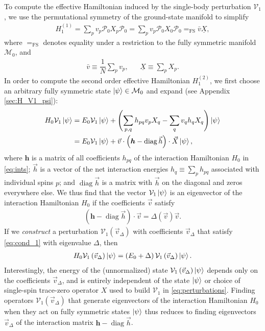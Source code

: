 \documentclass[nofootinbib,notitlepage,11pt]{revtex4-2}
\newcommand{\f}[2]{\dfrac{#1}{#2}} %
\newcommand{\p}[1]{\left(#1\right)} %
\renewcommand{\c}{\cdot} %
\newcommand{\m}{\bm} %
\renewcommand{\v}{\vec} %
\newcommand{\1}{\mathds{1}}
\newcommand{\M}{\mathcal{M}}
\renewcommand{\P}{\mathcal{P}}
\newcommand{\V}{\mathcal{V}}
\newcommand{\EQFS}{=_{\text{FS}}}
\newcommand{\col}{\underline}
\DeclareMathOperator{\diag}{diag}
\begin{document}
To compute the effective Hamiltonian induced by the single-body
perturbation $\V_1$, we use the permutational symmetry of the
ground-state manifold to simplify
\begin{align}
  H_1^{(1)} = \sum_p v_p \P_0 X_p \P_0
  = \sum_p v_p \P_0 X_0 \P_0 \EQFS \bar v \col{X},
  \label{eq:H_1_1}
\end{align}
where $\EQFS$ denotes equality under a restriction to the fully
symmetric manifold $\M_0$, and
\begin{align}
  \bar v \equiv \f1N \sum_p v_p,
  &&
  \col{X} \equiv \sum_p X_p.
\end{align}
In order to compute the second order effective Hamiltonian
$H_1^{(2)}$, we first choose an arbitrary fully symmetric state
$\ket\psi\in\M_0$ and expand (see Appendix \ref{sec:H_V1_psi}):
\begin{align}
  H_0 \V_1 \ket\psi
  &= E_0 \V_1 \ket\psi
  + \p{\sum_{p,q} h_{pq} v_p X_q - \sum_q v_q h_q X_q} \ket\psi \\
  &= E_0 \V_1 \ket\psi
  + \v v\c \p{\m h - \diag\v h}\c \v X \ket\psi,
  \label{eq:H_V1_psi}
\end{align}
where $\m h$ is a matrix of all coefficients $h_{pq}$ of the
interaction Hamiltonian $H_0$ in \eqref{eq:ints}; $\v h$ is a vector
of the net interaction energies $h_q\equiv\sum_ph_{pq}$ associated
with individual spins $p$; and $\diag\v h$ is a matrix with $\v h$ on
the diagonal and zeros everywhere else.  We thus find that the vector
$\V_1\ket\psi$ is an eigenvector of the interaction Hamiltonian $H_0$
if the coefficients $\v v$ satisfy
\begin{align}
  \p{\m h - \diag\v h}\c\v v = \Delta\p{\v v} \v v.
  \label{eq:cond_1}
\end{align}
If we {\it construct} a perturbation $\V_1\p{\v v_\Delta}$ with
coefficients $\v v_\Delta$ that satisfy \eqref{eq:cond_1} with
eigenvalue $\Delta$, then
\begin{align}
  H_0 \V_1\p{\v v_\Delta} \ket\psi
  = \p{E_0 + \Delta} \V_1\p{\v v_\Delta} \ket\psi.
\end{align}
Interestingly, the energy of the (unnormalized) state
$\V_1\p{\v v_\Delta}\ket\psi$ depends only on the coefficients
$\v v_\Delta$, and is entirely independent of the state $\ket\psi$ or
choice of single-spin trace-zero operator $X$ used to build $\V_1$ in
\eqref{eq:perturbations}.  Finding operators $\V_1\p{\v v_\Delta}$
that generate eigenvectors of the interaction Hamiltonian $H_0$ when
they act on fully symmetric states $\ket\psi$ thus reduces to finding
eigenvectors $\v v_\Delta$ of the interaction matrix $\m h-\diag\v h$.
\end{document}
